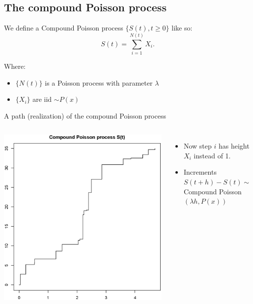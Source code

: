 \documentclass[11pt]{beamer}
\begin{document}
\subsection{The compound Poisson process}
\begin{frame}

We define a \alert{Compound Poisson process} $\lbrace S(t), t\geq0 \rbrace$ like so:
$$S(t)=\sum_{i=1}^{N(t)}X_i.$$

Where:

\begin{itemize}

\item $\{N(t)\}$ is a Poisson process with parameter $\lambda$

\item $\{X_i\}$ are iid $\sim P(x)$


\end{itemize}

\end{frame}
\begin{frame}{A path (realization) of the compound Poisson process}
\begin{columns}

\includegraphics[width=\textwidth,bb=0 0 495 503]{cPoisson}


\begin{itemize}
\item Now step $i$ has height $X_i$ instead of 1.

\item Increments $S(t+h)-S(t)\sim$
Compound Poisson$(\lambda h,P(x))$
\end{itemize}

\end{columns}
\end{frame}
\end{document}
